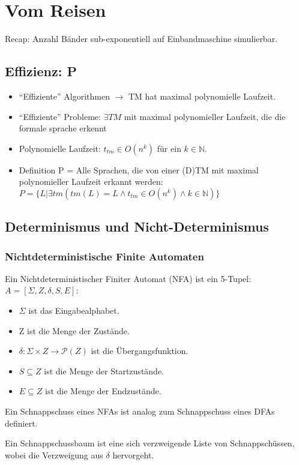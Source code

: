 \chapter{Vom Reisen}
Recap: Anzahl Bänder sub-exponentiell auf Einbandmaschine simulierbar.
\section{Effizienz: P}
\begin{itemize}
    \item ``Effiziente'' Algorithmen $\rightarrow$ TM hat maximal polynomielle Laufzeit.
    \item ``Effiziente'' Probleme: $\exists TM$ mit maximal polynomieller Laufzeit,
        die die formale sprache erkennt 
    \item Polynomielle Laufzeit: $t_{tm} \in O(n^k)$ für ein $k \in \mathbb{N}$.
    \item Definition P = Alle Sprachen,
        die von einer (D)TM mit maximal polynomieller Laufzeit erkannt werden:
        $P = \{L| \exists tm (tm(L) = L \wedge t_{tm} \in O(n^k) \wedge k \in \mathbb{N})\}$
\end{itemize}
\section{Determinismus und Nicht-Determinismus}
\subsection{Nichtdeterministische Finite Automaten}
Ein Nichtdeterministischer Finiter Automat (NFA) ist ein 5-Tupel:
$A = [\Sigma, Z, \delta, S, E]$:
\begin{itemize}
    \item $\Sigma$ ist das Eingabealphabet.
    \item Z ist die Menge der Zustände.
    \item $\delta: \Sigma \times Z \rightarrow \mathcal{P}(Z)$ ist die Übergangsfunktion.
    \item $S \subseteq Z$ ist die Menge der Startzustände.
    \item $E \subseteq Z$ ist die Menge der Endzustände.
\end{itemize}

Ein Schnappschuss eines NFAs ist analog zum Schnappschuss eines DFAs definiert.

Ein Schnappschussbaum ist eine sich verzweigende Liste von Schnappschüssen,
wobei die Verzweigung aus $\delta$ hervorgeht.

